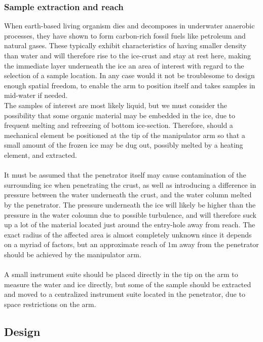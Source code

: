 \subsubsection{Sample extraction and reach}
When earth-based living organism dies and decomposes in underwater anaerobic processes, they have shown to form carbon-rich fossil fuels like petroleum and 	natural gases. These typically exhibit characteristics of having smaller density than water and will therefore rise to the ice-crust and stay at rest here, making the immediate layer underneath the ice an area of interest with regard to the selection of a sample location. In any case would it not be troublesome to design enough spatial freedom, to enable the arm to position itself and takes samples in mid-water if needed. 
\\The samples of interest are most likely liquid, but we must consider the possibility that some organic material may be embedded in the ice, due to frequent melting and refreezing of bottom ice-section. Therefore, should a mechanical element be positioned at the tip of the manipulator arm so that a small amount of the frozen ice may be dug out, possibly melted by a heating element, and extracted.
\\
\\It must be assumed that the penetrator itself may cause contamination of the surrounding ice when penetrating the crust, as well as introducing a difference in pressure between the water underneath the crust, and the water column melted by the penetrator. The pressure underneath the ice will likely be higher than the pressure in the water coloumn due to possible turbulence, and will therefore suck up a lot of the material located just around the entry-hole away from reach. The exact radius of the affected area is almost completely unknown since it depends on a myriad of factors, but an approximate reach of $1\mathrm{m}$ away from the penetrator should be achieved by the manipulator arm. 
\\
\\A small instrument suite should be placed directly in the tip on the arm to measure the water and ice directly, but some of the sample should be extracted and moved to a centralized instrument suite located in the penetrator, due to space restrictions on the arm.

\subsection{Design}

